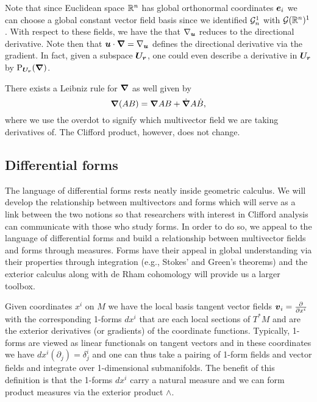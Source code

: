 Note that since Euclidean space $\mathbb{R}^n$ has global orthonormal coordinates $\boldsymbol{e}_i$ we can choose a global constant vector field basis since we identified $\mathcal{G}_n^1$ with $\mathcal{G}(\mathbb{R}^n)^1$. With respect to these fields, we have the that $\nabla_{\boldsymbol{u}}$ reduces to the directional derivative. Note then that $\boldsymbol{u} \cdot \boldsymbol{\nabla} = \nabla_{\boldsymbol{u}}$ defines the directional derivative via the gradient. In fact, given a subspace $\boldsymbol{U_r}$, one could even describe a derivative in $\boldsymbol{U_r}$ by $\operatorname{P}_{\boldsymbol{U_r}}(\boldsymbol{\nabla})$.

There exists a Leibniz rule for $\boldsymbol{\nabla}$ as well given by
\begin{equation}
\boldsymbol{\nabla}(AB) = \boldsymbol{\nabla} A B + \dot{\boldsymbol{\nabla}}A\dot{B},
\end{equation}
where we use the overdot to signify which multivector field we are taking derivatives of. The Clifford product, however, does not change. 

\subsection{Differential forms}
\label{subsec:differential_forms}

The language of differential forms rests neatly inside geometric calculus. We will develop the relationship between multivectors and forms which will serve as a link between the two notions so that researchers with interest in Clifford analysis can communicate with those who study forms. In order to do so, we appeal to the language of differential forms and build a relationship between multivector fields and forms through measures. Forms have their appeal in global understanding via their properties through integration (e.g., Stokes' and Green's theorems) and the exterior calculus along with de Rham cohomology will provide us a larger toolbox.

Given coordinates $x^i$ on $M$ we have the local basis tangent vector fields $\boldsymbol{v}_i=\frac{\partial}{\partial x^i}$  with the corresponding 1-forms $dx^i$ that are each local sections of $T^*M$ and are the exterior derivatives (or gradients) of the coordinate functions.  Typically, 1-forms are viewed as linear functionals on tangent vectors and in these coordinates we have $dx^i  (\partial_j) = \delta^i_j$ and one can thus take a pairing of 1-form fields and vector fields and integrate over 1-dimensional submanifolds. The benefit of this definition is that the 1-forms $dx^i$ carry a natural measure and we can form product measures via the exterior product $\wedge$.

